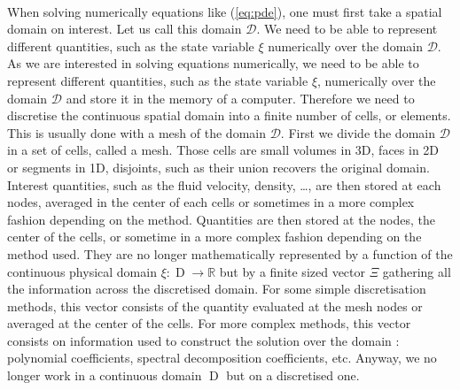     \paragraph{}
    When solving numerically equations like (\ref{eq:pde}), one must first take a spatial domain on interest.
    Let us call this domain $\mathcal{D}$.
    We need to be able to represent different quantities, such as the state variable $\xi$ numerically over the domain $\mathcal{D}$.
    As we are interested in solving equations numerically, we need to be able to represent different quantities, such as the state variable $\xi$, numerically over the domain $\mathcal{D}$ and store it in the memory of a computer.
    Therefore we need to discretise the continuous spatial domain into a finite number of cells, or elements.
    This is usually done with a mesh of the domain $\mathcal{D}$.
    First we divide the domain $\mathcal{D}$ in a set of cells, called a mesh.
    Those cells are small volumes in 3D, faces in 2D or segments in 1D, disjoints, such as their union recovers the original domain.
    Interest quantities, such as the fluid velocity, density, \dots, are then stored at each nodes, averaged in the center of each cells or sometimes in a more complex fashion depending on the method.
    Quantities are then stored at the nodes, the center of the cells, or sometime in a more complex fashion depending on the method used.
    They are no longer mathematically represented by a function of the continuous physical domain $\xi : \operatorname{D} \rightarrow \mathbb{R}$ but by a finite sized vector $\Xi$ gathering all the information across the discretised domain.
    For some simple discretisation methods, this vector consists of the quantity evaluated at the mesh nodes or averaged at the center of the cells.
    For more complex methods, this vector consists on information used to construct the solution over the domain : polynomial coefficients, spectral decomposition coefficients, etc.
    Anyway, we no longer work in a continuous domain $\operatorname{D}$ but on a discretised one.

